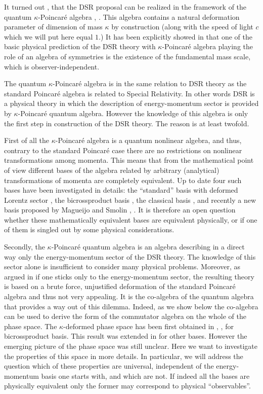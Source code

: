 \documentclass [prd,twocolumn,nofootinbib,showpacs]  {revtex4}
\begin{document}
It turned out \cite{jkgminl}, \cite{rbgacjkg} that the DSR
proposal can be realized in the  framework of the quantum
$\kappa$-Poincar\'e  algebra \cite{lunoruto}, \cite{maru}. This
algebra  contains a natural deformation parameter of dimension of
mass $\kappa$ by construction (along with the speed of light $c$
which we will put here equal $1$.) It has been explicitly showed
in \cite{rbgacjkg} that one of the basic physical prediction of
the DSR theory with $\kappa$-Poincar\'e  algebra  playing the role
of an algebra of symmetries is the existence of the fundamental
mass scale, which is observer-independent.

The quantum $\kappa$-Poincar\'e  algebra is in the same relation
to DSR theory as  the standard Poincar\'e  algebra is related to
Special Relativity. In other words DSR is a physical theory in
which the description of  energy-momentum sector is provided by
$\kappa$-Poincar\'e quantum algebra. However the knowledge of this
algebra is only the first step in construction of the DSR theory.
The reason is at least twofold.

First of all the $\kappa$-Poincar\'e  algebra is a quantum
nonlinear algebra, and thus,  contrary to the standard Poincar\'e
case there are no restrictions on nonlinear transformations among
momenta. This means that from the mathematical point of view
different bases of the algebra related by arbitrary (analytical)
transformations of momenta are completely equivalent. Up to date
four such bases have been investigated in details: the
``standard'' basis with deformed Lorentz sector \cite{lunoruto},
the bicrossproduct basis \cite{maru}, the classical basis
\cite{kolumaso}, and recently a new basis proposed by Magueijo and
Smolin \cite{JoaoLee}, \cite{juse}. It is therefore an open
question whether these mathematically equivalent bases are
equivalent physically, or if one of them is singled out by some
physical considerations.

Secondly, the $\kappa$-Poincar\'e quantum algebra is an algebra
describing in a direct way only the energy-momentum sector of the
DSR theory. The knowledge of this sector alone is insufficient to
consider many physical problems. Moreover, as argued in
\cite{lunoDSR} if one sticks only to the energy-momentum sector,
the resulting theory is based on a brute force, unjustified
deformation of the standard Poincar\'e algebra and thus not very
appealing. It is the co-algebra of the quantum algebra that
provides a way out of this dilemma. Indeed, as we show below  the
co-algebra can be used to derive the form of the commutator
algebra on the whole of the phase space. The $\kappa$-deformed
phase space  has been first obtained in \cite{crossalg},
\cite{luno}, \cite{lukps} for  bicrossproduct basis. This result
was extended  in \cite{juse} for other bases. However the emerging
picture of the phase space was still unclear. Here we want to
investigate the properties of this space in more details. In
particular, we will address the question which of these properties
are universal, independent of the energy-momentum basis one starts
with, and which are not. If indeed all the bases are physically
equivalent only the former may correspond to physical
``observables''.
\end{document}
